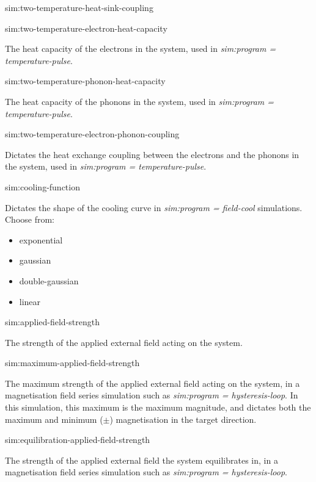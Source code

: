 {\zicf sim:two-temperature-heat-sink-coupling}

{\zicf sim:two-temperature-electron-heat-capacity} The heat capacity of the electrons in the system, used in \textit{sim:program = temperature-pulse}.

{\zicf sim:two-temperature-phonon-heat-capacity} The heat capacity of the phonons in the system, used in \textit{sim:program = temperature-pulse}.

{\zicf sim:two-temperature-electron-phonon-coupling}
Dictates the heat exchange coupling between the electrons and the phonons in the system, used in \newline\textit{sim:program = temperature-pulse}.

{\zicf sim:cooling-function} Dictates the shape of the cooling curve in \textit{sim:program = field-cool} simulations. Choose from:

\begin{itemize}
    \item[] exponential
    \item[] gaussian
    \item[] double-gaussian
    \item[] linear
\end{itemize}

{\zicf sim:applied-field-strength} The strength of the applied external field acting on the system.

{\zicf  sim:maximum-applied-field-strength}
The maximum strength of the applied external field acting on the system, in a magnetisation field series simulation such as \textit{sim:program = hysteresis-loop}. In this simulation, this maximum is the maximum magnitude, and dictates both the maximum and minimum ($\pm$) magnetisation in the target direction.

{\zicf sim:equilibration-applied-field-strength}
   The strength of the applied external field the system equilibrates in, in a magnetisation field series simulation such as \textit{sim:program = hysteresis-loop}.

